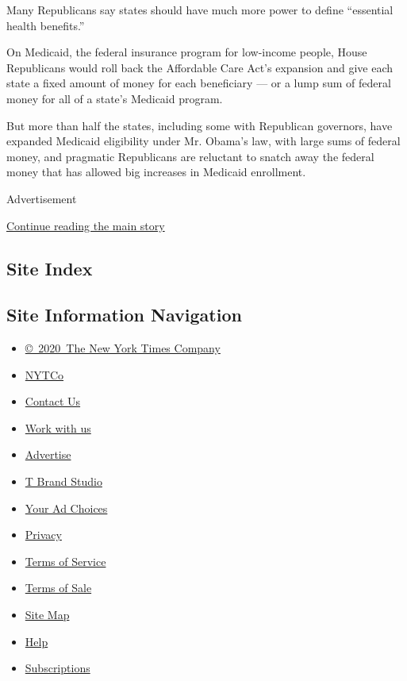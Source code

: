 Many Republicans say states should have much more power to define
``essential health benefits.''

On Medicaid, the federal insurance program for low-income people, House
Republicans would roll back the Affordable Care Act's expansion and give
each state a fixed amount of money for each beneficiary --- or a lump
sum of federal money for all of a state's Medicaid program.

But more than half the states, including some with Republican governors,
have expanded Medicaid eligibility under Mr. Obama's law, with large
sums of federal money, and pragmatic Republicans are reluctant to snatch
away the federal money that has allowed big increases in Medicaid
enrollment.

Advertisement

\protect\hyperlink{after-bottom}{Continue reading the main story}

\hypertarget{site-index}{%
\subsection{Site Index}\label{site-index}}

\hypertarget{site-information-navigation}{%
\subsection{Site Information
Navigation}\label{site-information-navigation}}

\begin{itemize}
\tightlist
\item
  \href{https://help.nytimes.com/hc/en-us/articles/115014792127-Copyright-notice}{©~2020~The
  New York Times Company}
\end{itemize}

\begin{itemize}
\tightlist
\item
  \href{https://www.nytco.com/}{NYTCo}
\item
  \href{https://help.nytimes.com/hc/en-us/articles/115015385887-Contact-Us}{Contact
  Us}
\item
  \href{https://www.nytco.com/careers/}{Work with us}
\item
  \href{https://nytmediakit.com/}{Advertise}
\item
  \href{http://www.tbrandstudio.com/}{T Brand Studio}
\item
  \href{https://www.nytimes.com/privacy/cookie-policy\#how-do-i-manage-trackers}{Your
  Ad Choices}
\item
  \href{https://www.nytimes.com/privacy}{Privacy}
\item
  \href{https://help.nytimes.com/hc/en-us/articles/115014893428-Terms-of-service}{Terms
  of Service}
\item
  \href{https://help.nytimes.com/hc/en-us/articles/115014893968-Terms-of-sale}{Terms
  of Sale}
\item
  \href{https://spiderbites.nytimes.com}{Site Map}
\item
  \href{https://help.nytimes.com/hc/en-us}{Help}
\item
  \href{https://www.nytimes.com/subscription?campaignId=37WXW}{Subscriptions}
\end{itemize}
